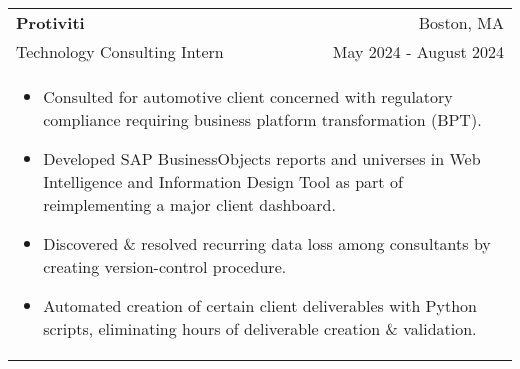 \documentclass[letterpaper,10pt]{article} %
\begin{document}
\begin{tabular*}{\linewidth}{@{\extracolsep{\fill}} lr }
\textbf{Protiviti} & \footnotesize{Boston, MA}\\
\footnotesize{Technology Consulting Intern} & \footnotesize{May 2024 - August 2024}\\
\multicolumn{2}{p{\linewidth}}{
    \scriptsize{\vspace{-3.25mm}\begin{itemize}
        \item Consulted for automotive client concerned with regulatory compliance requiring business platform transformation (BPT).
        \item Developed SAP BusinessObjects reports and universes in Web Intelligence and Information Design Tool as part of reimplementing a major client dashboard.
        \item Discovered \& resolved recurring data loss among consultants by creating version-control procedure.
        \item Automated creation of certain client deliverables with Python scripts, eliminating hours of deliverable creation \& validation.
    \end{itemize}}
}\\


\end{tabular*}
\end{document}
